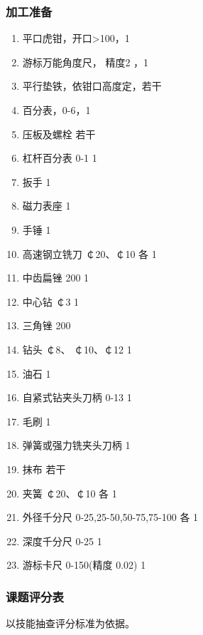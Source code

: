 \subsubsection{加工准备}
\begin{enumerate}[1、]
\item 平口虎钳，开口>100，1 
\item 游标万能角度尺， 精度2 ，1
\item 平行垫铁，依钳口高度定，若干 
\item 百分表，0-6，1
\item 压板及螺栓 若干 
\item 杠杆百分表 0-1 1
\item 扳手 1
\item  磁力表座 1
\item 手锤 1 
\item 高速钢立铣刀 ￠20、￠10 各 1
\item 中齿扁锉 200 1 
\item 中心钻 ￠3 1
\item 三角锉 200 
\item 钻头 ￠8、 ￠10、￠12 1
\item 油石 1 
\item 自紧式钻夹头刀柄 0-13 1
\item 毛刷 1
\item 弹簧或强力铣夹头刀柄 1
\item 抹布 若干 
\item 夹簧 ￠20、￠10 各 1
\item 外径千分尺 0-25,25-50,50-75,75-100 各 1 
\item 深度千分尺 0-25 1
\item 游标卡尺 0-150(精度 0.02) 1
\end{enumerate}
\subsubsection{课题评分表}

以技能抽查评分标准为依据。

